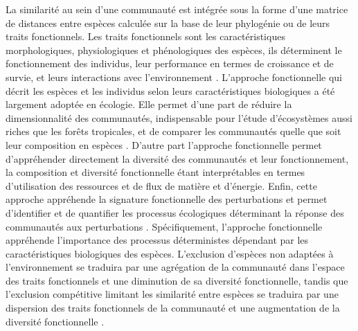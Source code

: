 \documentclass[
  11pt,
  french,
  A4paper,
  extrafontsizes,onecolumn,openright
  ]{memoir}
\begin{document}
La similarité au sein d'une communauté est intégrée sous la forme d'une
matrice de distances entre espèces calculée sur la base de leur
phylogénie ou de leurs traits fonctionnels. Les traits fonctionnels sont
les caractéristiques morphologiques, physiologiques et phénologiques des
espèces, ils déterminent le fonctionnement des individus, leur
performance en termes de croissance et de survie, et leurs interactions
avec l'environnement \autocite{Violle2007b}. L'approche fonctionnelle
qui décrit les espèces et les individus selon leurs caractéristiques
biologiques a été largement adoptée en écologie. Elle permet d'une part
de réduire la dimensionnalité des communautés, indispensable pour
l'étude d'écosystèmes aussi riches que les forêts tropicales, et de
comparer les communautés quelle que soit leur composition en espèces
\autocites{Begon2006}{Scheiter2013}{Mouillot2013a}{Sakschewski2016}.
D'autre part l'approche fonctionnelle permet d'appréhender directement
la diversité des communautés et leur fonctionnement, la composition et
diversité fonctionnelle étant interprétables en termes d'utilisation des
ressources et de flux de matière et d'énergie. Enfin, cette approche
appréhende la signature fonctionnelle des perturbations et permet
d'identifier et de quantifier les processus écologiques déterminant la
réponse des communautés aux perturbations \autocite{Funk2017}.
Spécifiquement, l'approche fonctionnelle appréhende l'importance des
processus déterministes dépendant par les caractéristiques biologiques
des espèces. L'exclusion d'espèces non adaptées à l'environnement se
traduira par une agrégation de la communauté dans l'espace des traits
fonctionnels et une diminution de sa diversité fonctionnelle, tandis que
l'exclusion compétitive limitant les similarité entre espèces se
traduira par une dispersion des traits fonctionnels de la communauté et
une augmentation de la diversité fonctionnelle
\autocites{McGill2006}{Kunstler2012}.
\end{document}
